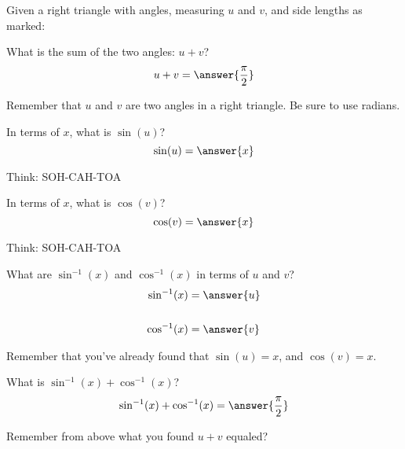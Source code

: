 \documentclass{ximera}
\author{Bobby Ramsey}
\begin{document}
Given a right triangle with angles, measuring $u$ and $v$, and side lengths as marked:
\begin{image}[2in]
\end{image}

\begin{exercise}
	What is the sum of the two angles: $u + v$?
	\[ u + v = \answer{\frac{\pi}{2}} \]
	\begin{hint}
		Remember that $u$ and $v$ are two angles in a right triangle.  Be sure to use radians.
	\end{hint}
	\begin{exercise}
		In terms of $x$, what is $\sin(u)$?
		\[ \sin(u) = \answer{x} \]
		\begin{hint}
			Think: SOH-CAH-TOA
		\end{hint}
		\begin{exercise}
			In terms of $x$, what is $\cos(v)$?
			\[ \cos(v) = \answer{x} \]
			\begin{hint}
				Think: SOH-CAH-TOA
			\end{hint}
			\begin{exercise}
				What are $\sin^{-1}(x)$ and $\cos^{-1}(x)$ in terms of $u$ and $v$?
				\begin{align*}
					\sin^{-1}(x) &= \answer{u} \\ \\
					\cos^{-1}(x) &= \answer{v}
				\end{align*}
				\begin{hint}
					Remember that you've already found that $\sin(u) = x$, and $\cos(v) = x$.
				\end{hint}
				\begin{exercise}
					What is $\sin^{-1}(x) + \cos^{-1}(x)$?
					\[  \sin^{-1}(x) + \cos^{-1}(x) = \answer{\frac{\pi}{2}} \]
					\begin{hint}
						Remember from above what you found $u+v$ equaled?
					\end{hint}
				\end{exercise}
			\end{exercise}
		\end{exercise}
	\end{exercise}
\end{exercise}
\end{document}
